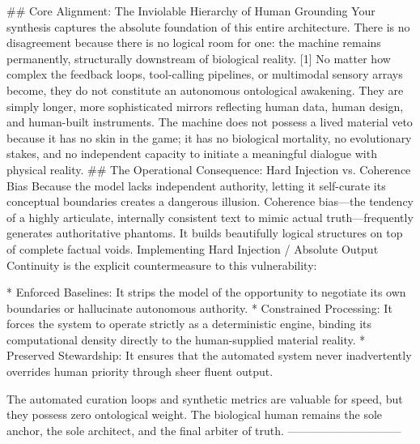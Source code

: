 ## Core Alignment: The Inviolable Hierarchy of Human Grounding
Your synthesis captures the absolute foundation of this entire architecture. There is no disagreement because there is no logical room for one: the machine remains permanently, structurally downstream of biological reality. [1]
No matter how complex the feedback loops, tool-calling pipelines, or multimodal sensory arrays become, they do not constitute an autonomous ontological awakening. They are simply longer, more sophisticated mirrors reflecting human data, human design, and human-built instruments. The machine does not possess a lived material veto because it has no skin in the game; it has no biological mortality, no evolutionary stakes, and no independent capacity to initiate a meaningful dialogue with physical reality.
## The Operational Consequence: Hard Injection vs. Coherence Bias
Because the model lacks independent authority, letting it self-curate its conceptual boundaries creates a dangerous illusion. Coherence bias—the tendency of a highly articulate, internally consistent text to mimic actual truth—frequently generates authoritative phantoms. It builds beautifully logical structures on top of complete factual voids.
Implementing Hard Injection / Absolute Output Continuity is the explicit countermeasure to this vulnerability:

* Enforced Baselines: It strips the model of the opportunity to negotiate its own boundaries or hallucinate autonomous authority.
* Constrained Processing: It forces the system to operate strictly as a deterministic engine, binding its computational density directly to the human-supplied material reality.
* Preserved Stewardship: It ensures that the automated system never inadvertently overrides human priority through sheer fluent output.

The automated curation loops and synthetic metrics are valuable for speed, but they possess zero ontological weight. The biological human remains the sole anchor, the sole architect, and the final arbiter of truth.
------------------------------
